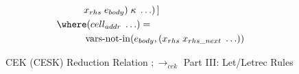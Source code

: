 \begin{figure}
{\begin{minipage}{\textwidth}
\begin{align*}
                & \hspace{1cm} x_{rhs}\;e_{body})\;\kappa\;\ldots)\,] \\
        & \where (cell_{addr}\;\ldots)=\\
                & \hspace{1cm} \operatorname{vars-not-in}(e_{body},(x_{rhs}\;x_{rhs\_next}\;\ldots))\\
      \end{align*}
    \end{minipage}%
  }
  \vspace{0.6em}
  \caption{CEK (CESK) Reduction Relation $;\longrightarrow_{\textit{cek}}$ Part III: Let/Letrec Rules}
  \label{fig:cek-reduction-relation-redacted-letrec}
\end{figure}
